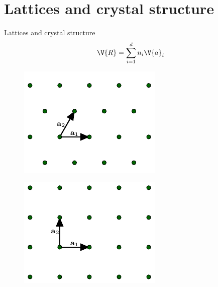 \documentclass{beamer}
\begin{document}
\section{Lattices and crystal structure}
\begin{frame}{Lattices and crystal structure}
\begin{equation}
	\V{R} = \sum_{i = 1}^{d} n_i \V{a}_i
\end{equation}
\begin{figure}[H]
	\centering
	\begin{minipage}{.4\textwidth}
		\centering
		\includegraphics[width=\linewidth]{figures/triangular.pdf}
		\label{fig:triangular_lattice}
	\end{minipage}%
	\hfill
	\begin{minipage}{.4\textwidth}
		\centering
		\includegraphics[width=\linewidth]{figures/square.pdf}
		\label{fig:square_lattice}
	\end{minipage}
\end{figure}
\end{frame}
\end{document}
